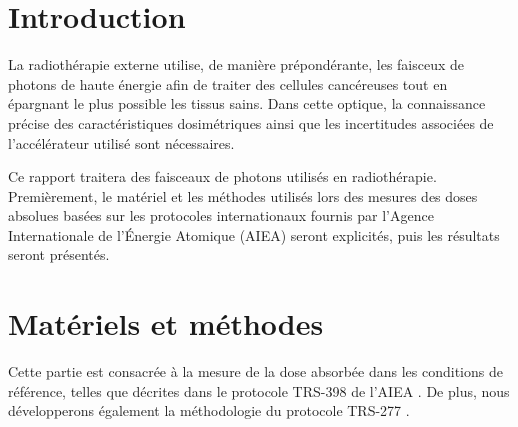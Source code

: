 \documentclass{article}
\begin{document}




\onehalfspacing

\pagestyle{fancy}
	\renewcommand\headrulewidth{0.5pt}
	\renewcommand\footrulewidth{0.5pt}
	\fancyfoot[R]{\thepage}

\tableofcontents
\clearpage
\section{Introduction}

La radiothérapie externe utilise, de manière prépondérante, les faisceux de photons de haute énergie afin de traiter des cellules cancéreuses tout en épargnant le plus possible les tissus sains. Dans cette optique, la connaissance précise des caractéristiques dosimétriques ainsi que les incertitudes associées de l'accélérateur utilisé sont nécessaires. 

Ce rapport traitera des faisceaux de photons utilisés en radiothérapie. Premièrement, le matériel et les méthodes utilisés lors des mesures des doses absolues basées sur les protocoles internationaux fournis par l'Agence Internationale de l'Énergie Atomique (AIEA) seront explicités, puis les résultats seront présentés. 

\section{Matériels et méthodes}

Cette partie est consacrée à la mesure de la dose absorbée dans les conditions de référence, telles que décrites dans le protocole TRS-398 de l'AIEA \cite{international2001iaea}. De plus, nous développerons également la méthodologie du protocole TRS-277 \cite{internationaliaea}.
\end{document}
